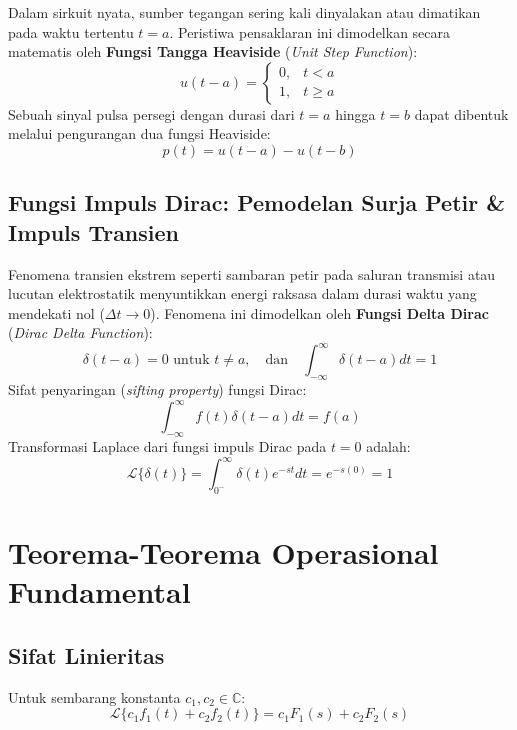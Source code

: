 \documentclass[11pt,a4paper]{article}
\theoremstyle{definition}
\begin{document}
Dalam sirkuit nyata, sumber tegangan sering kali dinyalakan atau dimatikan pada waktu tertentu $t = a$. Peristiwa pensaklaran ini dimodelkan secara matematis oleh \textbf{Fungsi Tangga Heaviside} (\textit{Unit Step Function}):
\begin{equation}
    u(t - a) = \begin{cases} 0, & t < a \\ 1, & t \ge a \end{cases}
    \label{eq:heaviside_def}
\end{equation}
Sebuah sinyal pulsa persegi dengan durasi dari $t = a$ hingga $t = b$ dapat dibentuk melalui pengurangan dua fungsi Heaviside:
\begin{equation}
    p(t) = u(t - a) - u(t - b)
    \label{eq:rectangular_pulse}
\end{equation}

\subsection{Fungsi Impuls Dirac: Pemodelan Surja Petir \& Impuls Transien}

Fenomena transien ekstrem seperti sambaran petir pada saluran transmisi atau lucutan elektrostatik menyuntikkan energi raksasa dalam durasi waktu yang mendekati nol ($\Delta t \to 0$). Fenomena ini dimodelkan oleh \textbf{Fungsi Delta Dirac} (\textit{Dirac Delta Function}):
\begin{equation}
    \delta(t - a) = 0 \text{ untuk } t \neq a, \quad \text{dan} \quad \int_{-\infty}^\infty \delta(t - a) dt = 1
    \label{eq:dirac_def}
\end{equation}
Sifat penyaringan (\textit{sifting property}) fungsi Dirac:
\begin{equation}
    \int_{-\infty}^\infty f(t) \delta(t - a) dt = f(a)
    \label{eq:sifting_prop}
\end{equation}
Transformasi Laplace dari fungsi impuls Dirac pada $t = 0$ adalah:
\begin{equation}
    \mathcal{L}\{\delta(t)\} = \int_{0^-}^\infty \delta(t) e^{-st} dt = e^{-s(0)} = 1
    \label{eq:lt_dirac}
\end{equation}

\section{Teorema-Teorema Operasional Fundamental}

\subsection{Sifat Linieritas}
Untuk sembarang konstanta $c_1, c_2 \in \mathbb{C}$:
\begin{equation}
    \mathcal{L}\{c_1 f_1(t) + c_2 f_2(t)\} = c_1 F_1(s) + c_2 F_2(s)
\end{equation}
\end{document}
